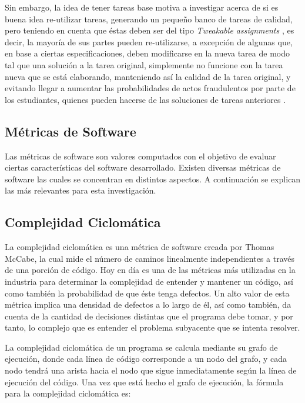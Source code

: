 \documentclass[letterpaper,12pt]{article}
\begin{document}
Sin embargo, la idea de tener tareas base motiva a investigar acerca de si es buena idea re-utilizar tareas, generando un pequeño banco de tareas de calidad, pero teniendo en cuenta que éstas deben ser del tipo \textit{Tweakable assignments} \cite{10.1145/3477429}, es decir, la mayoría de sus partes pueden re-utilizarse, a excepción de algunas que, en base a ciertas especificaciones, deben modificarse en la nueva tarea de modo tal que una solución a la tarea original, simplemente no funcione con la tarea nueva que se está elaborando, manteniendo así la calidad de la tarea original, y evitando llegar a aumentar las probabilidades de actos fraudulentos por parte de los estudiantes, quienes pueden hacerse de las soluciones de tareas anteriores \cite{10.1145/3013499.3013507}.

\subsection{Métricas de Software}

Las métricas de software son valores computados con el objetivo de evaluar ciertas características del software desarrollado\cite{1702275}. Existen diversas métricas de software las cuales se concentran en distintos aspectos. A continuación se explican las más relevantes para esta investigación.

\subsection{Complejidad Ciclomática}

La complejidad ciclomática es una métrica de software creada por Thomas McCabe, la cual mide el número de caminos linealmente independientes a través de una porción de código\cite{7725232}. Hoy en día es una de las métricas más utilizadas en la industria para determinar la complejidad de entender y mantener un código, así como también la probabilidad de que éste tenga defectos. Un alto valor de esta métrica implica una densidad de defectos a lo largo de él, así como también, da cuenta de la cantidad de decisiones distintas que el programa debe tomar, y por tanto, lo complejo que es entender el problema subyacente que se intenta resolver.

La complejidad ciclomática de un programa se calcula mediante su grafo de ejecución, donde cada línea de código corresponde a un nodo del grafo, y cada nodo tendrá una arista hacia el nodo que sigue inmediatamente según la línea de ejecución del código. Una vez que está hecho el grafo de ejecución, la fórmula para la complejidad ciclomática es:
\end{document}
